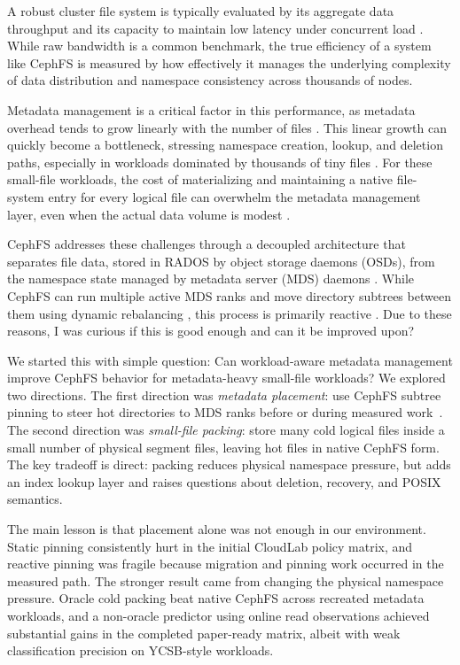 \documentclass[letterpaper,twocolumn,10pt]{article}
\begin{document}
A robust cluster file system is typically evaluated by its aggregate data throughput and its capacity to maintain low latency under concurrent load \cite{ior-mdtest}. While raw bandwidth is a common benchmark, the true efficiency of a system like CephFS is measured by how effectively it manages the underlying complexity of data distribution and namespace consistency across thousands of nodes. 

Metadata management is a critical factor in this performance, as metadata overhead tends to grow linearly with the number of files \cite{cephfs}. This linear growth can quickly become a bottleneck, stressing namespace creation, lookup, and deletion paths, especially in workloads dominated by thousands of tiny files \cite{ior-mdtest, tablefs}. For these small-file workloads, the cost of materializing and maintaining a native file-system entry for every logical file can overwhelm the metadata management layer, even when the actual data volume is modest \cite{deltafs}.

CephFS addresses these challenges through a decoupled architecture that separates file data, stored in RADOS by object storage daemons (OSDs), from the namespace state managed by metadata server (MDS) daemons \cite{cephfs}. While CephFS can run multiple active MDS ranks and move directory subtrees between them using dynamic rebalancing \cite{cephfs-multimds}, this process is primarily reactive \cite{cephfs-pinning}. Due to these reasons, I was curious if this is good enough and can it be improved upon?

We started this with simple question: Can workload-aware  metadata management improve CephFS behavior for metadata-heavy small-file workloads? We explored two directions. The first direction was \emph{metadata
placement}: use CephFS subtree pinning to steer hot directories to MDS ranks before or during measured work~\cite{cephfs-pinning}. The second direction was
\emph{small-file packing}: store many cold logical files inside a small number of physical segment files, leaving hot files in native CephFS form. The key tradeoff is direct: packing reduces physical namespace pressure, but adds an index lookup layer and raises questions about deletion, recovery, and POSIX semantics.

The main lesson is that placement alone was not enough in our environment. Static pinning consistently hurt in the initial CloudLab policy matrix, and reactive pinning was fragile because migration and pinning work occurred in the
measured path. The stronger result came from changing the physical namespace pressure. Oracle cold packing beat native CephFS across recreated metadata
workloads, and a non-oracle predictor using online read observations achieved substantial gains in the completed paper-ready matrix, albeit with weak classification precision on YCSB-style workloads.
\end{document}
